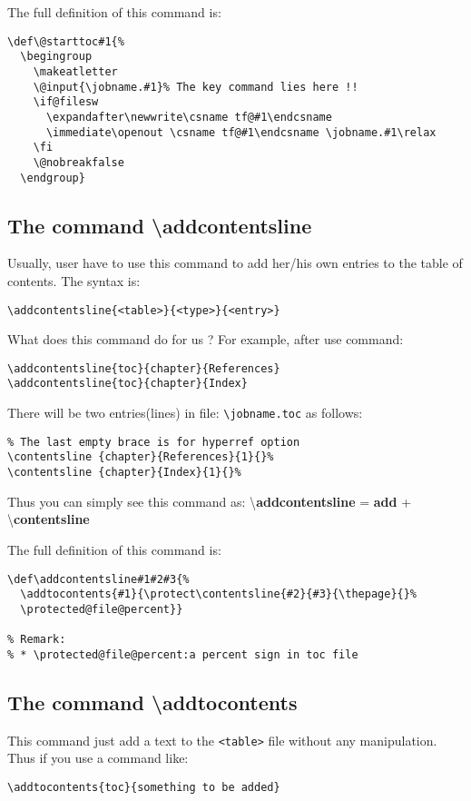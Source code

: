 \documentclass{article}
\begin{document}
The full definition of this command is:
\begin{lstlisting}
\def\@starttoc#1{%
  \begingroup
    \makeatletter
    \@input{\jobname.#1}% The key command lies here !!
    \if@filesw
      \expandafter\newwrite\csname tf@#1\endcsname
      \immediate\openout \csname tf@#1\endcsname \jobname.#1\relax
    \fi
    \@nobreakfalse
  \endgroup}
\end{lstlisting}


\subsection{The command \textbackslash addcontentsline}
Usually, user have to use this command to add her/his own entries to the table of contents. The syntax is:
\begin{lstlisting}
\addcontentsline{<table>}{<type>}{<entry>}
\end{lstlisting}

What does this command do for us ? For example, after use command:
\begin{lstlisting}
\addcontentsline{toc}{chapter}{References}
\addcontentsline{toc}{chapter}{Index}
\end{lstlisting}

There will be two entries(lines) in file: \verb|\jobname.toc| as follows:
\begin{lstlisting}
% The last empty brace is for hyperref option
\contentsline {chapter}{References}{1}{}%
\contentsline {chapter}{Index}{1}{}%
\end{lstlisting}

Thus you can simply see this command as: \textbackslash\textbf{addcontentsline} = \textbf{add} + \textbackslash\textbf{contentsline}

The full definition of this command is:
\begin{lstlisting}
\def\addcontentsline#1#2#3{%
  \addtocontents{#1}{\protect\contentsline{#2}{#3}{\thepage}{}%
  \protected@file@percent}}

% Remark: 
% * \protected@file@percent:a percent sign in toc file
\end{lstlisting}


\subsection{The command \textbackslash addtocontents}
This command just add a text to the \verb|<table>| file without any manipulation. Thus if you use a command like:
\begin{lstlisting}
\addtocontents{toc}{something to be added}
\end{lstlisting}
\end{document}
